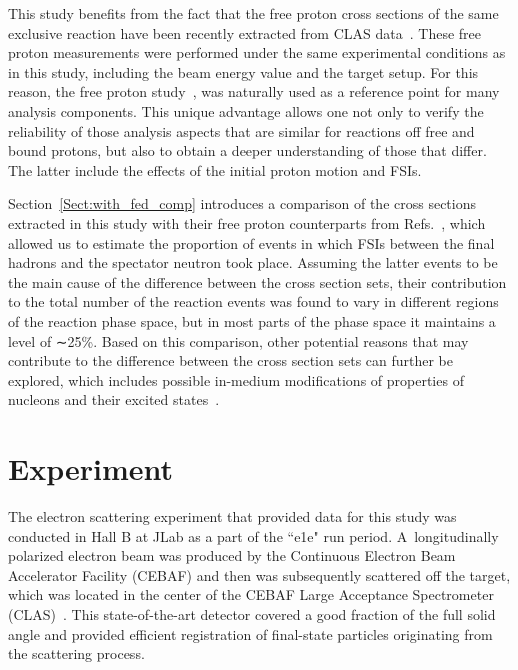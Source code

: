 \documentclass[prc,twocolumn,superscriptaddress,showpacs,amssymb,amsmath,amsfonts,aps,nofootinbib]{revtex4-1}
\begin{document}
This study benefits from the fact that the free proton cross sections of the same exclusive reaction have been recently extracted from CLAS data~\cite{Fed_an_note:2017,Fed_paper_2018}. These free proton measurements were performed under the same experimental conditions as in this study, including the beam energy value and the target setup. For this reason, the free proton study~\cite{Fed_an_note:2017,Fed_paper_2018}, was naturally used as a reference point for many analysis components. This unique advantage allows one not only to verify the reliability of those analysis aspects that are similar for reactions off free and bound protons, but also to obtain a deeper understanding of those that differ. The latter include the effects of the initial proton motion and FSIs.


Section~\ref{Sect:with_fed_comp} introduces a comparison of the cross sections extracted in this study with their free proton counterparts from Refs.\!~\cite{Fed_an_note:2017,Fed_paper_2018}, which allowed us to estimate the proportion of events in which FSIs between the final hadrons and the spectator neutron took place. Assuming the latter events to be the main cause of the difference between the cross section sets, their contribution to the total number of the reaction events was found to vary in different regions of the reaction phase space, but in most parts of the phase space it maintains a level of ∼25\%. Based on this comparison, other potential reasons that may contribute to the difference between the cross section sets can further be explored, which includes possible in-medium modifications of properties of nucleons and their excited states~\cite{Mokeev:1995fy,Bianchi:1994ax,Ahrens:1986hn,Krusche:2004xz,Noble:1980my}.



\section{Experiment}
\label{Chapt:experiment}

The electron scattering experiment that provided data for this study was conducted in Hall B at JLab as a part of the ``e1e" run period. A~longitudinally polarized electron beam was produced by the Continuous Electron Beam Accelerator Facility (CEBAF) and then was subsequently scattered off the target, which was located in the center of the CEBAF Large Acceptance Spectrometer (CLAS)~\cite{Mecking:2003zu}. This state-of-the-art detector covered a good fraction of the full solid angle and provided efficient registration of final-state particles originating from the scattering process.
\end{document}
